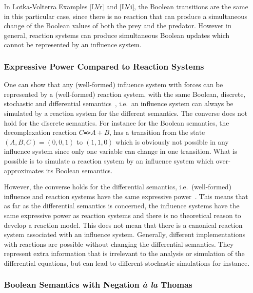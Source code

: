 \documentclass[graybox]{svmult}
\begin{document}
In Lotka-Volterra Examples \ref{LVr} and \ref{LVi},
the Boolean transitions are the same
in this particular case, since there is no reaction that can produce a simultaneous change of the Boolean values of both the prey and the predator.
However in general, reaction systems can produce simultaneous Boolean updates which cannot be represented by an influence system.



\subsubsection{Expressive Power Compared to Reaction Systems}


One can show that any (well-formed) influence system with forces can be represented by a (well-formed) reaction system,
with the same Boolean, discrete, stochastic and differential semantics~\cite{FMRS16cmsb},
i.e.~an influence system can always be simulated by a reaction system for the different semantics.
The converse does not hold for the discrete semantics. For instance for the Boolean semantics, the decomplexation reaction $C$\lstinline|=>|$A+B$,
  has a transition from the state $(A,B,C)=(0,0,1)$ to $(1,1,0)$ which is obviously
  not possible in any influence system since only one variable can change in one transition.
  What is possible is to simulate a reaction system by an influence system which over-approximates its Boolean semantics.

  However, the converse holds for the differential semantics,
  i.e.~(well-formed) influence and reaction systems have the same expressive power~\cite{FMRS16cmsb}.
This means that as far as the differential semantics is concerned,
the influence systems have the same expressive power as reaction systems
and there is no theoretical reason to develop a reaction model.
This does not mean that there is a canonical reaction system associated with an influence system.
Generally, different implementations with reactions are possible without changing the differential semantics.
They represent extra information that is irrelevant to the analysis or simulation of the differential equations,
but can lead to different stochastic simulations for instance.



\subsubsection{Boolean Semantics with Negation \emph{\`a la} Thomas}\label{Thomas}
\end{document}

